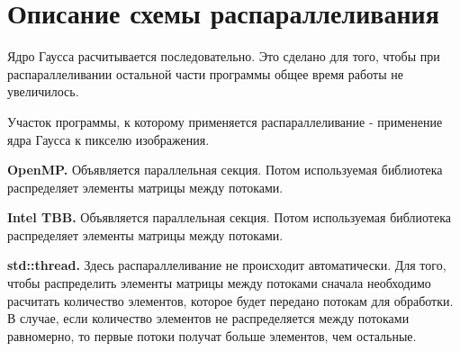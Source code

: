 \documentclass{report}
\begin{document}
\section*{Описание схемы распараллеливания}
\par Ядро Гаусса расчитывается последовательно. Это сделано для того, чтобы при распараллеливании остальной части программы общее время работы не увеличилось.
\par Участок программы, к которому применяется распараллеливание - применение ядра Гаусса к пикселю изображения. 
\par \textbf {OpenMP.} Объявляется параллельная секция. Потом используемая библиотека распределяет элементы матрицы между потоками.
\par \textbf {Intel TBB.} Объявляется параллельная секция. Потом используемая библиотека распределяет элементы матрицы между потоками.
\par \textbf {std::thread.} Здесь распараллеливание не происходит автоматически. Для того, чтобы распределить элементы матрицы между потоками сначала необходимо расчитать количество элементов, которое будет передано потокам для обработки. В случае, если количество элементов не распределяется между потоками равномерно, то первые потоки получат больше элементов, чем остальные.
\newpage
\end{document}
